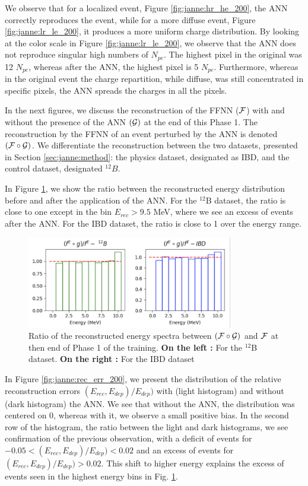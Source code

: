 \documentclass[../main.tex]{subfiles}
\begin{document}
We observe that for a localized event, Figure \ref{fig:janne:hr_he_200}, the ANN correctly reproduces the event, while for a more diffuse event, Figure \ref{fig:janne:lr_le_200}, it produces a more uniform charge distribution. By looking at the color scale in Figure \ref{fig:janne:lr_le_200}, we observe that the ANN does not reproduce singular high numbers of $N_{pe}$. The highest pixel in the original was 12 $N_{pe}$, whereas after the ANN, the highest pixel is 5 $N_{pe}$. Furthermore, whereas in the original event the charge repartition, while diffuse, was still concentrated in specific pixels, the ANN spreads the charges in all the pixels.

In the next figures, we discuss the reconstruction of the FFNN (${\cal F}$) with and without the presence of the ANN $({\cal G})$ at the end of this Phase 1. The reconstruction by the FFNN of an event perturbed by the ANN is denoted $({\cal F} \circ {\cal G})$. We differentiate the reconstruction between the two datasets, presented in Section \ref{sec:janne:method}: the physics dataset, designated as IBD, and the control dataset, designated $^{12}B$.

In Figure \ref{fig:janne:f_circ_over_f_200}, we show the ratio between the reconstructed energy distribution before and after the application of the ANN. For the $^{12}$B dataset, the ratio is close to one except in the bin $E_{rec} > 9.5$ MeV, where we see an excess of events after the ANN. For the IBD dataset, the ratio is close to 1 over the energy range.

\begin{figure}[ht]
  \centering
  \includegraphics[height=4cm]{images/janne/f_circ_over_f_200.png}
  \caption{Ratio of the reconstructed energy spectra between $({\cal F} \circ {\cal G})$ and ${\cal F}$ at then end of Phase 1 of the training. \textbf{On the left :} For the $^{12}$B dataset. \textbf{On the right :} For the IBD dataset}
  \label{fig:janne:f_circ_over_f_200}
\end{figure}

In Figure \ref{fig:janne:rec_err_200}, we present the distribution of the relative reconstruction errors $(E_{rec}, E_{dep})/E_{dep})$ with (light histogram) and without (dark histogram) the ANN. We see that without the ANN, the distribution was centered on 0, whereas with it, we observe a small positive bias. In the second row of the histogram, the ratio between the light and dark histograms, we see confirmation of the previous observation, with a deficit of events for $-0.05 < (E_{rec}, E_{dep})/E_{dep}) < 0.02$ and an excess of events for $(E_{rec}, E_{dep})/E_{dep}) > 0.02$. This shift to higher energy explains the excess of events seen in the highest energy bins in Fig. \ref{fig:janne:f_circ_over_f_200}.
\end{document}
